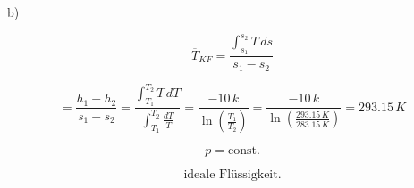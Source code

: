b)

\[
\overline{T}_{KF} = \frac{\int_{s_1}^{s_2} T \, ds}{s_1 - s_2}
\]

\[
= \frac{h_1 - h_2}{s_1 - s_2} = \frac{\int_{T_1}^{T_2} T \, dT}{\int_{T_1}^{T_2} \frac{dT}{T}} = \frac{-10 \, k}{\ln \left( \frac{T_1}{T_2} \right)} = \frac{-10 \, k}{\ln \left( \frac{293.15 \, K}{283.15 \, K} \right)} = 293.15 \, K
\]

\[
p = \text{const.}
\]

\[
\text{ideale Flüssigkeit.}
\]